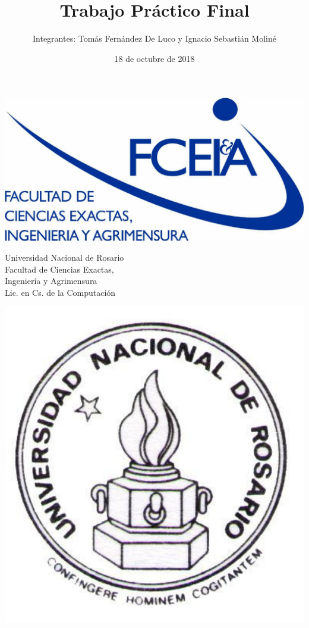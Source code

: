 \documentclass{article}
\title{Trabajo Práctico Final}
\author{Integrantes: Tomás Fernández De Luco y Ignacio Sebastián Moliné}
\date{18 de octubre de 2018}
\begin{document}
\begin{titlepage}

\begin{minipage}{2.6cm}
\includegraphics[width=\textwidth]{fceia.pdf}
\end{minipage}
\hfill
%
\begin{minipage}{6cm}
\begin{center}
\normalsize{Universidad Nacional de Rosario\\
Facultad de Ciencias Exactas,\\
Ingeniería y Agrimensura\\}
\vspace{0.5cm}
\large
Lic. en Cs. de la Computación
\end{center}
\end{minipage}
\hspace{0.5cm}
\hfill
\begin{minipage}{2.6cm}
\includegraphics[width=\textwidth]{unr.pdf}
\end{minipage}


\end{titlepage}
\end{document}
